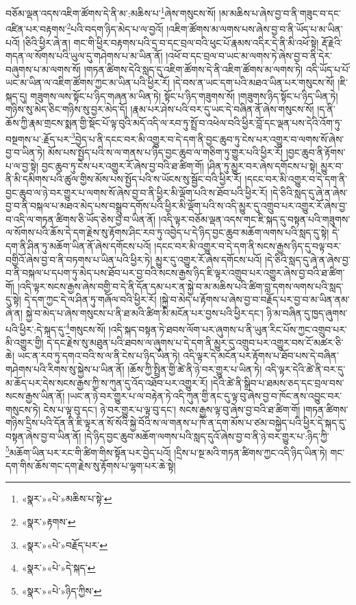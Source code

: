 བཅོམ་ལྡན་འདས་འཇིག་ཚོགས་དེ་ནི་མ་:མཆིས་པ་\footnote{«སྣར་»«པེ་»མཆིས་པ་སྟེ་}ཞེས་གསུངས་སོ། །མ་མཆིས་པ་ཞེས་བྱ་བ་ནི་གཟུང་བ་དང་འཛིན་པར་བརྟགས་\footnote{«སྣར་»རྟགས་}པའི་བདག་ཉིད་མེད་པ་ལ་བྱའོ། །འཇིག་ཚོགས་མ་ལགས་པས་ཞེས་བྱ་བ་ནི་ཡོད་པ་མ་ཡིན་པའོ། །ཅིའི་ཕྱིར་ཞེ་ན། གང་གི་ཕྱིར་བརྟགས་པའི་དྲ་བ་དང་བྲལ་བའི་ཕུང་པོ་རྣམས་འདིར་དེ་ནི་མི་འཕོ་སྟེ། རྡོ་རྗེའི་གདན་ལ་སོགས་པའི་ཡུལ་དུ་གཤེགས་པ་མ་ཡིན་ནོ། །འཕོ་བ་དང་བྲལ་བ་ཡང་མ་ལགས་ཏེ་ཞེས་བྱ་བ་ནི་དེར་བཞུགས་པ་མ་ལགས་སོ། །གཏན་ཚིགས་དེའི་སླད་དུ་འཇིག་ཚོགས་དེ་ནི་འཇིག་ཚོགས་མ་ལགས་ཏེ། འདི་ཡོད་པ་པོ་ཡང་མ་ཡིན་ལ་འཇིག་ཚོགས་ཀྱང་མ་ཡིན་པའི་ཕྱིར་རོ། །དེ་བས་ན་ཡང་དག་པའི་མཐའ་ཡིན་པར་གསུངས་སོ། །ཇི་སྐད་དུ། གཟུགས་ལས་སྟོང་པ་ཉིད་གཞན་མ་ཡིན་ཏེ། སྟོང་པ་ཉིད་གཟུགས་སོ། །གཟུགས་ཉིད་སྟོང་པ་ཉིད་ཡིན་ཏེ། གཉིས་སུ་མེད་ཅིང་གཉིས་སུ་བྱར་མེད་དོ། །རྣམ་པར་ཤེས་པའི་བར་དུ་ཡང་དེ་བཞིན་ནོ་ཞེས་གསུངས་སོ། །ད་ནི་ཆོས་ཀྱི་རྣམ་གྲངས་སྨན་གྱི་སྡོང་པོ་ལྟ་བུའི་མདོ་འདི་ལ་རབ་ཏུ་སྤྲོ་བ་འཕེལ་བའི་ཕྱིར་བློ་དང་ལྡན་པས་དེའི་འོག་ཏུ་བསྔགས་པ་:རྗོད་པར་\footnote{«སྣར་»«པེ་»བརྗོད་པར་}བྱེད་པ་ནི་དངང་བར་མི་འགྱུར་བ་དེ་དག་ནི་བྱང་ཆུབ་ཏུ་ངེས་པར་འགྱུར་བ་ལགས་སོ་ཞེས་བྱ་བ་ཡིན་ཏེ། མོས་པས་སྤྱོད་པའི་ས་ལ་གནས་པ་ཉིད་བྱང་ཆུབ་ལ་གཅིག་ཏུ་གྱུར་པའི་ཕྱིར་རོ། །བྱང་ཆུབ་ནི་རྟོགས་པ་ལ་བྱ་སྟེ། བྱང་ཆུབ་ཏུ་ངེས་པར་འགྱུར་རོ་ཞེས་བྱ་བའི་ཐ་ཚིག་གོ། །ཤིན་ཏུ་མྱུར་བར་ཞེས་དགོངས་པ་སྟེ། མྱུར་བ་ནི་མི་དམིགས་པའི་ཚུལ་གྱིས་མོས་པས་སྤྱོད་པའི་ས་ཡོངས་སུ་སྦྱོང་བའི་ཕྱིར་རོ། །དངང་བར་མི་འགྱུར་བ་དེ་དག་ནི་བྱང་ཆུབ་ལ་ཉེ་བར་གྱུར་པ་ལགས་སོ་ཞེས་བྱ་བ་ནི་ཕྱིར་མི་ལྡོག་པའི་ས་ཐོབ་པའི་ཕྱིར་རོ། །དེ་ཅིའི་སླད་དུ་ཞེ་ན་ཞེས་བྱ་བ་ནི་བསྐལ་པ་མཐའ་མེད་པས་བསྒྲུབ་དགོས་པའི་ཕྱིར་མི་ལྡོག་པའི་ས་འདི་མྱུར་དུ་འགྲུབ་པར་འགྱུར་རོ་ཞེས་བྱ་བ་འདི་ལ་གཏན་ཚིགས་ཅི་ཡོད་ཅེས་བྱ་བ་ཡིན་ནོ། །འདི་ལྟར་བཅོམ་ལྡན་འདས་གང་ཇི་སྐད་དུ་བསྟན་པའི་གཟུགས་ལ་སོགས་པའི་ཆོས་དེ་དག་རྗེས་སུ་རྟོགས་ཤིང་རབ་ཏུ་འབྱེད་པ་དེ་ཉིད་བྱང་ཆུབ་མཆོག་ལགས་པའི་སླད་དུ་སྟེ། དེ་དག་ནི་ཤིན་ཏུ་མཆོག་ཡིན་ནོ་ཞེས་དགོངས་པའོ། །དངང་བར་མི་འགྱུར་བ་དེ་དག་ནི་སངས་རྒྱས་ཉིད་དུ་བལྟ་བར་བགྱིའོ་ཞེས་བྱ་བ་ནི་བཏགས་པ་ཡིན་པའི་ཕྱིར་ཏེ། མྱུར་དུ་འགྱུར་རོ་ཞེས་དགོངས་པའོ། །དེ་ཅིའི་སླད་དུ་ཞེ་ན་ཞེས་བྱ་བ་ནི་བསྐལ་པ་དཔག་ཏུ་མེད་པས་ཐོབ་པར་བྱ་བའི་སངས་རྒྱས་ཉིད་ཇི་ལྟར་འགྲུབ་པར་འགྱུར་ཞེས་བྱ་བའི་ཐ་ཚིག་གོ། །འདི་ལྟར་སངས་རྒྱས་ཞེས་བགྱི་བ་དེ་ནི་དོན་དམ་པར་ན་སྐྱེ་བ་མ་མཆིས་པའི་ཚིག་བླ་དགས་ལགས་པའི་སླད་དུ་སྟེ། དེ་དག་ཀྱང་དེ་ལ་ཤིན་ཏུ་གཞོལ་བའི་ཕྱིར་རོ། །སྐྱེ་བ་མེད་པ་རྟོགས་པ་ཞེས་བྱ་བ་བརྗོད་པར་བྱ་བ་མ་ཡིན་ནམ་ཞེ་ན། སྐྱེ་བ་མེད་པ་ཞེས་གསུངས་པ་ནི་ཐ་མའི་ཚིག་མི་མངོན་པར་བྱས་པའི་ཕྱིར་དང་། ཉི་མ་བཞིན་དུ་ཁྱད་ཞུགས་པའི་ཕྱིར་:དེ་སྐད་དུ་\footnote{«སྣར་»«པེ་»དེ་སྐད་}གསུངས་སོ། །འདི་སྐད་བསྟན་ཏེ་ཐབས་ལོག་པར་ཞུགས་པ་ནི་ཡུན་རིང་པོས་ཀྱང་འགྲུབ་པར་མི་འགྱུར་གྱི། དེ་དང་རྗེས་སུ་མཐུན་པའི་ཐབས་ལ་ཞུགས་པ་དེ་དག་ནི་མྱུར་དུ་འགྲུབ་པར་འགྱུར་བས་ངོ་མཚར་ཅི་ཆེ། ཡང་ན་རབ་ཏུ་དགའ་བའི་ས་ལ་ནི་ངེས་པ་ཉིད་ཡིན་ཏེ། འདི་ལྟར་དེ་མངོན་པར་རྟོགས་པ་ཐོབ་པས་དེ་བཞིན་གཤེགས་པའི་རིགས་སུ་སྐྱེས་པ་ཡིན་ནོ། །ཆོས་ཀྱི་སྤྲིན་གྱི་ཚེ་ནི་ཉེ་བར་གྱུར་པ་ཡིན་ཏེ། འདི་ལྟར་དེའི་ཚེ་ནི་བར་དུ་མ་ཆོད་པར་དེས་སངས་རྒྱས་ཀྱི་ས་ཀུན་དུ་འོད་འཐོབ་པར་འགྱུར་རོ། །དེའི་ཚེ་ནི་སྒྲིབ་པ་ཐམས་ཅད་དང་བྲལ་བས་སངས་རྒྱས་ཡིན་ནོ། །ཡང་ན་ཉེ་བར་གྱུར་པ་ལ་བརྟེན་ཏེ་འདི་ཀུན་གྱི་ནང་དུ་ལྟ་བུ་ཞེས་བྱ་བ་ཁོང་ནས་འབྱུང་བར་གསུངས་ཏེ། ངེས་པ་ལྟ་བུ་དང་། ཉེ་བར་གྱུར་པ་ལྟ་བུ་དང་། སངས་རྒྱས་ལྟ་བུ་ཞེས་བྱ་བའི་ཐ་ཚིག་གོ། །གཏན་ཚིགས་གཉིས་དྲིས་པའི་དོན་ནི་ཇི་ལྟར་ན་སོ་སོའི་སྐྱེ་བོའི་ས་ལ་གནས་པ་ཁོ་ན་དག་མོས་པ་ཙམ་བསྐྱེད་པའི་ཕྱིར་དེ་སྐད་དུ་བསྟན་ཞེས་བྱ་བ་ཡིན་ནོ། །དེ་ཉིད་བྱང་ཆུབ་མཆོག་ལགས་པའི་སླད་དུའོ་ཞེས་བྱ་བ་ནི་ཉེ་བར་གྱུར་པ་:ཉིད་ཀྱི་\footnote{«སྣར་»«པེ་»ཉིད་ཀྱིས་}མཆོག་ཡིན་པར་རང་གི་ཚིག་གིས་སྟོན་པར་བྱེད་པའོ། །དྲིས་པ་སྔ་མའི་གཏན་ཚིགས་ཀྱང་འདི་ཉིད་ཡིན་ཏེ། གང་དག་གིས་ཆོས་གང་དག་རྗེས་སུ་རྟོགས་པ་ལྷག་པར་ཆེ་སྟེ། 